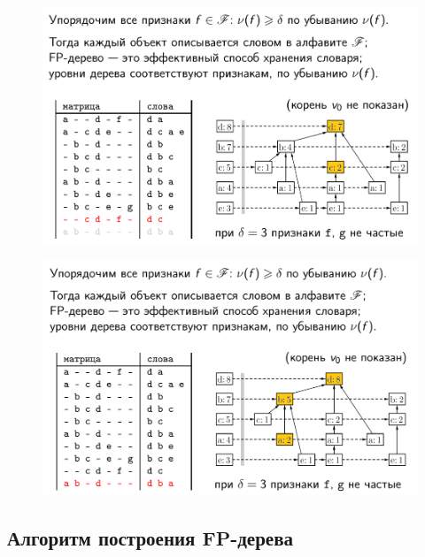 \documentclass{beamer}
\begin{document}
\begin{frame}
	\begin{figure}[h]
		\centering
		\includegraphics[scale=0.45]{images/lec08-pic41.png}
	\end{figure}
\end{frame}

\begin{frame}
	\begin{figure}[h]
		\centering
		\includegraphics[scale=0.45]{images/lec08-pic42.png}
	\end{figure}
\end{frame}

\subsection{Алгоритм построения FP-дерева}
\end{document}
